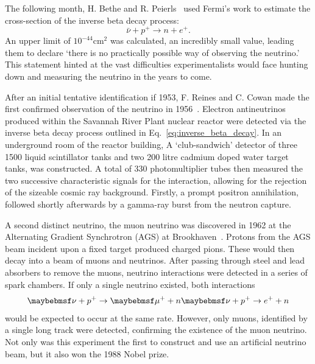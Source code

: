 The following month, H. Bethe and R. Peierls~\cite{bethe1934} used Fermi's work to estimate the
cross-section of the inverse beta decay process:
\begin{equation} %
    \bar{\nu} + p^{+} \rightarrow n + e^{+}.
    \label{eq:inverse_beta_decay}
\end{equation}
An upper limit of $10^{-44} \mathrm{cm}^2$ was calculated, an incredibly small value, leading them
to declare `there is no practically possible way of observing the neutrino.' This statement hinted
at the vast difficulties experimentalists would face hunting down and measuring the neutrino in
the years to come.

After an initial tentative identification if 1953, F. Reines and C. Cowan made the first confirmed
observation of the neutrino in 1956~\cite{cowan1956}. Electron antineutrinos produced within the
Savannah River Plant nuclear reactor were detected via the inverse beta decay process outlined in
Eq.~\ref{eq:inverse_beta_decay}. In an underground room of the reactor building, A `club-sandwich'
detector of three \unit{1500}{\litre} liquid scintillator tanks and two 200 litre cadmium doped
water target tanks, was constructed. A total of 330 photomultiplier tubes then measured the two
successive characteristic signals for the interaction, allowing for the rejection of the sizeable
cosmic ray background. Firstly, a prompt positron annihilation, followed shortly afterwards by a
gamma-ray burst from the neutron capture.

A second distinct neutrino, the muon neutrino was discovered in 1962 at the Alternating Gradient
Synchrotron (AGS) at Brookhaven~\cite{danby1962}. Protons from the AGS beam incident upon a fixed
target produced charged pions. These would then decay into a beam of muons and neutrinos. After
passing through steel and lead absorbers to remove the muons, neutrino interactions were detected
in a series of spark chambers. If only a single neutrino existed, both interactions
\begin{equation} %
    \nu+p^{+}\rightarrow\mu^{+}+n \\
    \nu+p^{+}\rightarrow e^{+}+n
\end{equation}
would be expected to occur at the same rate. However, only muons, identified by a single long
track were detected, confirming the existence of the muon neutrino. Not only was this experiment
the first to construct and use an artificial neutrino beam, but it also won the 1988 Nobel prize.

